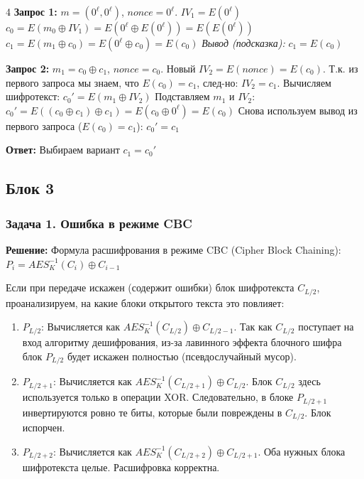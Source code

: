 ﻿\documentclass[8pt,a4paper,landscape]{extarticle}
\newcommand{\tightlist}{}
\begin{document}
\begin{multicols*}{4}
\textbf{Запрос 1:} \(m = (0^\ell, 0^\ell)\), \(nonce = 0^\ell\). \(IV_1 = E(0^\ell)\) \(c_0 = E(m_0 \oplus IV_1) = E(0^\ell \oplus E(0^\ell)) = E(E(0^\ell))\) \(c_1 = E(m_1 \oplus c_0) = E(0^\ell \oplus c_0) = E(c_0)\) \emph{Вывод (подсказка):} \textbf{\(c_1 = E(c_0)\)}

\textbf{Запрос 2:} \(m_1 = c_0 \oplus c_1\), \(nonce = c_0\). Новый \(IV_2 = E(nonce) = E(c_0)\). Т.к. из первого запроса мы знаем, что \(E(c_0) = c_1\), след-но: \textbf{\(IV_2 = c_1\)}. Вычисляем шифротекст: \(c_0' = E(m_1 \oplus IV_2)\) Подставляем \(m_1\) и \(IV_2\): \(c_0' = E((c_0 \oplus c_1) \oplus c_1) = E(c_0 \oplus 0^\ell) = E(c_0)\) Снова используем вывод из первого запроса (\(E(c_0) = c_1\)): \textbf{\(c_0' = c_1\)}

\textbf{Ответ:} Выбираем вариант \textbf{\(c_1 = c_0'\)}

\subsection{Блок 3}\label{ux431ux43bux43eux43a-3}

\subsubsection{Задача 1. Ошибка в режиме CBC}\label{ux437ux430ux434ux430ux447ux430-1.-ux43eux448ux438ux431ux43aux430-ux432-ux440ux435ux436ux438ux43cux435-cbc}

\textbf{Решение:} Формула расшифрования в режиме CBC (Cipher Block Chaining): \(P_i = AES^{-1}_K(C_i) \oplus C_{i-1}\)

Если при передаче искажен (содержит ошибки) блок шифротекста \(C_{L/2}\), проанализируем, на какие блоки открытого текста это повлияет:

\begin{enumerate}
\def\labelenumi{\arabic{enumi}.}
\tightlist
\item
  \textbf{\(P_{L/2}\)}: Вычисляется как \(AES^{-1}_K(C_{L/2}) \oplus C_{L/2 - 1}\). Так как \(C_{L/2}\) поступает на вход алгоритму дешифрования, из-за лавинного эффекта блочного шифра блок \(P_{L/2}\) будет искажен полностью (псевдослучайный мусор).
\item
  \textbf{\(P_{L/2 + 1}\)}: Вычисляется как \(AES^{-1}_K(C_{L/2 + 1}) \oplus C_{L/2}\). Блок \(C_{L/2}\) здесь используется только в операции XOR. Следовательно, в блоке \(P_{L/2 + 1}\) инвертируются ровно те биты, которые были повреждены в \(C_{L/2}\). Блок испорчен.
\item
  \textbf{\(P_{L/2 + 2}\)}: Вычисляется как \(AES^{-1}_K(C_{L/2 + 2}) \oplus C_{L/2 + 1}\). Оба нужных блока шифротекста целые. Расшифровка корректна.
\end{enumerate}


\end{multicols*}
\end{document}

